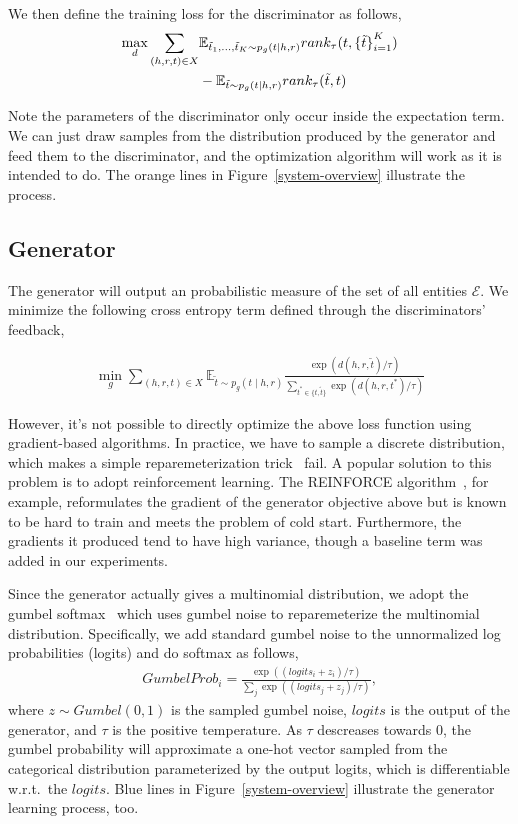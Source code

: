 \documentclass[twocolumn,a4paper,10pt,preprint,3p]{elsarticle}
\begin{document}
We then define the training loss for the discriminator as follows,
\begin{align}
    \max_d \sum_{(h, r, t)\in X}
        &\mathbb{E}_{\tilde t_1, \dots, \tilde t_K \sim p_g(t \mid h, r)}
            rank_\tau(t, {\{\tilde t \}}_{i=1}^K) \notag \\
        &- \mathbb{E}_{\tilde t \sim p_g(t \mid h, r)}
            rank_\tau(\tilde t, t) \label{eq:d_loss}
\end{align}


Note the parameters of the discriminator only occur inside the expectation term. We can just draw samples from the distribution produced by the generator and feed them to the discriminator, and the optimization algorithm will work as it is intended to do. The orange lines in Figure~\ref{system-overview} illustrate the process.

\subsection{Generator}

The generator will output an probabilistic measure of the set of all entities $\mathcal{E}$. We minimize the following cross entropy term defined through the discriminators' feedback,

\begin{align}
    \min_g \sum_{(h, r, t)\in X}
        \mathbb{E}_{\tilde t \sim p_g(t \mid h, r)}
            \frac{\exp(d(h, r, \tilde t) / \tau)}
                 {\sum_{t^* \in \{ t, \tilde t\}} \exp(d(h, r, t^*) / \tau)} \label{eq:g_loss}
\end{align}

However, it's not possible to directly optimize the above loss function using gradient-based algorithms. In practice, we have to sample a discrete distribution, which makes a simple reparemeterization trick~\cite{VAE} fail. A popular solution to this problem is to adopt reinforcement learning. The REINFORCE algorithm~\cite{Williams_1992}, for example, reformulates the gradient of the generator objective above but is known to be hard to train and meets the problem of cold start. Furthermore, the gradients it produced tend to have high variance, though a baseline term was added in our experiments.

Since the generator actually gives a multinomial distribution, we adopt the gumbel softmax~\cite{GumbelSoftmax_Jiang_2016} which uses gumbel noise to reparemeterize the multinomial distribution. Specifically, we add standard gumbel noise to the unnormalized log probabilities (logits) and do softmax as follows,
\begin{align*}
    GumbelProb_i = \frac{\exp((logits_i + z_i)/ \tau)}{\sum_{j}\exp((logits_j + z_j)/ \tau)},
\end{align*}
where $z \sim Gumbel(0, 1)$ is the sampled gumbel noise, $logits$ is the output of the generator, and $\tau$ is the positive temperature. As $\tau$ descreases towards 0, the gumbel probability will approximate a one-hot vector sampled from the categorical distribution parameterized by the output logits, which is differentiable w.r.t.\ the $logits$. Blue lines in Figure~\ref{system-overview} illustrate the generator learning process, too.
\end{document}

